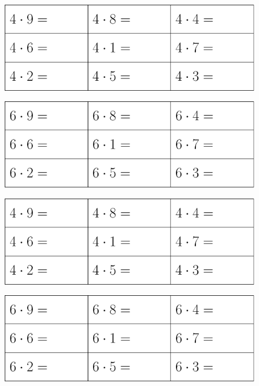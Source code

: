 

\renewcommand{\vs}{\vspace{40pt}}

	 \thispagestyle{empty}
\begin{figure}
	\includegraphics[]{g4}
\end{figure}
\vs
\begin{figure}
	\includegraphics[]{g6}
\end{figure}		
\vs
\begin{figure}
\includegraphics[]{g4}
\end{figure}
\vs
\begin{figure}
	\includegraphics[]{g6}
\end{figure}	






